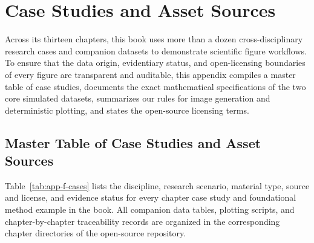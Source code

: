 \chapter{Case Studies and Asset Sources}
\label{app:case-sources}

Across its thirteen chapters, this book uses more than a dozen cross-disciplinary research cases and companion datasets to demonstrate scientific figure workflows. To ensure that the data origin, evidentiary status, and open-licensing boundaries of every figure are transparent and auditable, this appendix compiles a master table of case studies, documents the exact mathematical specifications of the two core simulated datasets, summarizes our rules for image generation and deterministic plotting, and states the open-source licensing terms.

\section{Master Table of Case Studies and Asset Sources}

Table~\ref{tab:app-f-cases} lists the discipline, research scenario, material type, source and license, and evidence status for every chapter case study and foundational method example in the book. All companion data tables, plotting scripts, and chapter-by-chapter traceability records are organized in the corresponding chapter directories of the open-source repository.

